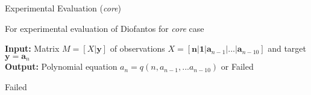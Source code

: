 \documentclass[t,usenames,dvipsnames]{beamer} %
\newcommand{\1}{\boldsymbol{1}}
\newcommand{\0}{\boldsymbol{0}}
\begin{document}
\begin{frame}{Experimental Evaluation (\textit{core})}
     
    \begin{algorithm}[H]
        \caption{For experimental evaluation of Diofantos for \textit{core} case
        }
    \raggedright
        \textbf{Input:} Matrix  $M = [X|\textbf{y}]$ of observations 
         $X = [\textbf{n}|\textbf{1}|\textbf{a}_{n-1}|...|\textbf{a}_{n-10}]$ 
         and target $\textbf{y} = \textbf{a}_n$
        \\
        \textbf{Output:} Polynomial equation $a_n = q(n, a_{n-1}, ... a_{n-10})$ or Failed
    \begin{algorithmic}[1]
        \EndIf
        \EndFor
    \EndFor
    \State \Return Failed
    \EndFunction
    \end{algorithmic}
    \end{algorithm}
 \end{frame}
\end{document}
